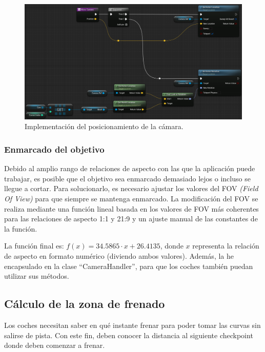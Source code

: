 \begin{figure}[H]
    \centering
    \includegraphics[width=\textwidth]{imagenes/blueprints/CameraFollower.moveCamera.png}
    \caption{Implementación del posicionamiento de la cámara.}
    \label{fig:bp-cam2}
\end{figure}

\subsubsection{Enmarcado del objetivo}

Debido al amplio rango de relaciones de aspecto con las que la aplicación puede trabajar, es posible que el objetivo sea enmarcado demasiado lejos o incluso se llegue a cortar. Para solucionarlo, es necesario ajustar los valores del FOV \textit{(Field Of View)} para que siempre se mantenga enmarcado. La modificación del FOV se realiza mediante una función lineal basada en los valores de FOV más coherentes para las relaciones de aspecto 1:1 y 21:9 y un ajuste manual de las constantes de la función. 

\bigskip

La función final es: $f(x) = 34.5865 \cdot x + 26.4135$, donde $x$ representa la relación de aspecto en formato numérico (diviendo ambos valores). Además, la he encapsulado en la clase ``CameraHandler'', para que los coches también puedan utilizar sus métodos.

\subsection{Cálculo de la zona de frenado}

Los coches necesitan saber en qué instante frenar para poder tomar las curvas sin salirse de pista. Con este fin, deben conocer la distancia al siguiente checkpoint donde deben comenzar a frenar.

